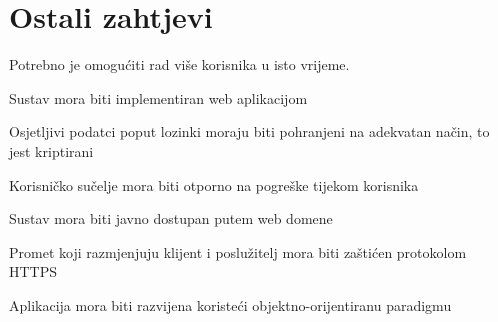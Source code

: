 %				
				\eject
	
		\section{Ostali zahtjevi}
			\begin{packed_item}
				\item Potrebno je omogućiti rad više korisnika u isto vrijeme.
				\item Sustav mora biti implementiran web aplikacijom
				\item Osjetljivi podatci poput lozinki moraju biti pohranjeni na adekvatan način, to jest kriptirani
				\item Korisničko sučelje mora biti otporno na pogreške tijekom korisnika
				\item Sustav mora biti javno dostupan putem web domene 
				\item Promet koji razmjenjuju klijent i poslužitelj mora biti zaštićen protokolom HTTPS
				\item Aplikacija mora biti razvijena koristeći objektno-orijentiranu paradigmu
			\end{packed_item}
%		 
			 
			 
			 
	